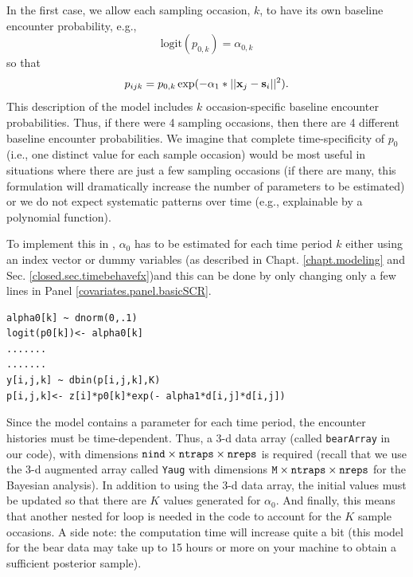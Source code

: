 In the first case, we allow each sampling occasion, $k$, to have its
own baseline encounter probability, e.g.,
\[
\mbox{logit}(p_{0,k}) = \alpha_{0,k}
\]
so that
\[
p_{ijk} = p_{0,k} \exp(- \alpha_1*||{\bf x}_{j}-{\bf s}_{i}||^2).
\]
This description of the model includes $k$ occasion-specific baseline
encounter probabilities.  Thus, if there were 4 sampling occasions, then
there are 4 different baseline encounter probabilities.  We imagine
that complete time-specificity of $p_{0}$ 
(i.e., one distinct value for each sample occasion)
would be most useful in situations
where there are just a few sampling occasions (if there are many, this
formulation will dramatically increase the number of parameters to be
estimated) or we do not expect systematic patterns over time (e.g.,
explainable by a polynomial function).

To implement this in \jags, $\alpha_0$ has to be
estimated for each time period $k$ either using an index vector or
dummy variables (as described in Chapt. \ref{chapt.modeling} and Sec. 
\ref{closed.sec.timebehavefx})and this can be done by only 
changing only a few lines in Panel \ref{covariates.panel.basicSCR}.

\begin{verbatim}
alpha0[k] ~ dnorm(0,.1)
logit(p0[k])<- alpha0[k]
.......
.......
y[i,j,k] ~ dbin(p[i,j,k],K)
p[i,j,k]<- z[i]*p0[k]*exp(- alpha1*d[i,j]*d[i,j])
\end{verbatim}

Since the model contains a parameter for each time period, the
encounter histories must be time-dependent.  Thus, a 3-d data array
(called \mbox{\tt bearArray} in our code), with dimensions $\mbox{\tt
  nind} \times \mbox{\tt ntraps} \times \mbox{\tt nreps}$ is
required (recall that we use the 3-d augmented array called {\tt Yaug}
with dimensions $\mbox{\tt M} \times \mbox{\tt ntraps} \times \mbox{\tt nreps}$
for the Bayesian analysis). In addition to using the 3-d data array, the initial values
must be updated so that there are $K$ values generated for $\alpha_0$.
And finally, this means that another nested for loop is needed
in the code to account for the $K$ sample occasions.  A side note: the
computation time will increase quite a bit (this model for the bear
data may take up to 15 hours or more on your machine to obtain a
sufficient posterior sample).

